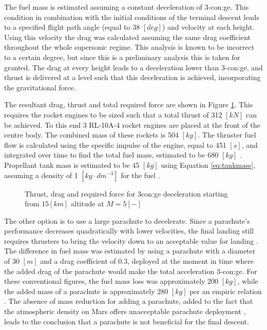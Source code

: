 The fuel mass is estimated assuming a constant deceleration of 3-\gls{con:ge}. This condition in combination with the initial conditions of the terminal descent leads to a specified flight path angle (equal to 38 $[deg]$) and velocity at each height. Using this velocity the drag was calculated assuming the same drag coefficient throughout the whole supersonic regime. This analysis is known to be incorrect to a certain degree, but since this is a preliminary analysis this is taken for granted. The drag at every height leads to a deceleration lower than 3-\gls{con:ge}, and thrust is delivered at a level such that this deceleration is achieved, incorporating the gravitational force. 

The resultant drag, thrust and total required force are shown in Figure \ref{fig:TDforce}. This requires the rocket engines to be sized such that a total thrust of 312 $[kN]$ can be achieved. To this end 3 RL-10A-4 rocket engines are placed at the front of the centre body. The combined mass of these rockets is 504 $[kg]$. The thruster fuel flow is calculated using the specific impulse of the engine, equal to 451 $[s]$, and integrated over time to find the total fuel mass, estimated to be 680 $[kg]$ \cite[p.538]{Wertz2011}. Propellant tank mass is estimated to be 45 $[kg]$ using Equation \ref{eq:tankmass}, assuming a density of 1 $[kg\cdot dm^{-3}]$ for the fuel \cite[p.543]{Wertz2011}.

\begin{figure}[h]
	\centering
	\setlength{} 
	\setlength{}
	
	\caption{Thrust, drag and required force for 3\gls{con:ge} deceleration starting from $15 \left[km\right]$ altitude at $M=5 \left[-\right]$}
	\label{fig:TDforce}
\end{figure}


The other option is to use a large parachute to decelerate. Since a parachute's performance decreases quadratically with lower velocities, the final landing still requires thrusters to bring the velocity down to an acceptable value for landing \cite{Braun2007}. The difference in fuel mass was estimated by using a parachute with a diameter of 30 $[m]$ and a drag coefficient of 0.3, deployed at the moment in time where the added drag of the parachute would make the total acceleration 3-\gls{con:ge}. For these conventional figures, the fuel mass loss was approximately 200 $[kg]$, while the added mass of a parachute is approximately 280 $[kg]$ per an empiric relation \cite{Anderson1969}. The absence of mass reduction for adding a parachute, added to the fact that the atmospheric density on Mars offers unacceptable parachute deployment \cite{Korzun2009}, leads to the conclusion that a parachute is not beneficial for the final descent.

